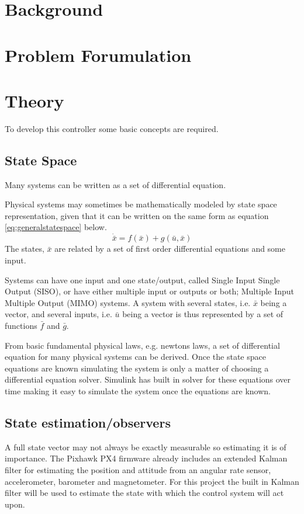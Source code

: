 \documentclass{article}
\begin{document}
\newpage

\tableofcontents

\newpage

\newpage

\section{Background}


\section{Problem Forumulation}


\section{Theory}
To develop this controller some basic concepts are required.
\subsection{State Space}
Many systems can be written as a set of differential equation.

Physical systems may sometimes be mathematically modeled by state space representation, given that it can be written on the same form as equation \ref{eq:generalstatespace} below.
\begin{equation}
    \dot{\bar{x}} = f(\bar{x}) + g(\bar{u},\bar{x})
    \label{eq:generalstatespace}
\end{equation}
The states, $\bar{x}$ are related by a set of first order differential equations and some input.

Systems can have one input and one state/output, called Single Input Single Output (SISO), or have either multiple input or outputs or both; Multiple Input Multiple Output (MIMO) systems.
A system with several states, i.e. $\bar{x}$ being a vector, and several inputs, i.e. $\bar{u}$ being a vector is thus represented by a set of functions $\bar{f}$ and $\bar{g}$.

From basic fundamental physical laws, e.g. newtons laws, a set of differential equation for many physical systems can be derived.
Once the state space equations are known simulating the system is only a matter of choosing a differential equation solver.
Simulink has built in solver for these equations over time making it easy to simulate the system once the equations are known.

\subsection{State estimation/observers}
A full state vector may not always be exactly measurable so estimating it is of importance.
The Pixhawk PX4 firmware already includes an extended Kalman filter for estimating the position and attitude from an angular rate sensor, accelerometer, barometer and magnetometer.
For this project the built in Kalman filter will be used to estimate the state with which the control system will act upon.
\end{document}
